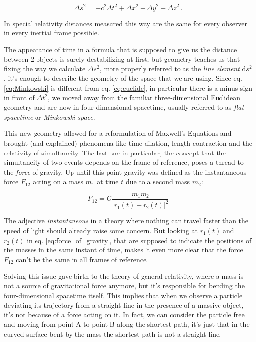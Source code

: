 \begin{equation}
    \Delta s^2 = - c^2 \Delta t^2 + \Delta x^2 + \Delta y^2 + \Delta z^2 \, .
    \label{eq:Minkowski}
\end{equation}

In special relativity distances measured this way are the same for every
observer in every inertial frame possible.

The appearance of time in a formula that is supposed to give us the distance
between 2 objects is surely destabilizing at first, but geometry teaches us
that fixing the way we calculate $\Delta s^2$, more properly referred to as the
\textit{line element} $\mathrm{d}s^2$, it's enough to describe the geometry of
the space that we are using.
Since eq. \ref{eq:Minkowski} is different from eq. \ref{eq:euclide}, in
particular there is a minus sign in front of $\Delta t^2$, we moved away from
the familiar three-dimensional Euclidean geometry and are now in
four-dimensional spacetime, usually referred to as \textit{flat spacetime} or
\textit{Minkowski space}.

This new geometry allowed for a reformulation of Maxwell's Equations and
brought (and explained) phenomena like time dilation, length contraction and the
relativity of simultaneity.
The last one in particular, the concept that the simultaneity of two events
depends on the frame of reference, poses a thread to the \textit{force} of
gravity.
Up until this point gravity was defined as the instantaneous force $F_{12}$
acting on a mass $m_1$ at time $t$ due to a second mass $m_2$:

\begin{equation}
    F_{12} = G \frac{m_1 m_2}{|r_1(t) - r_2(t)|^2}
    \label{eq:force_of_gravity}
\end{equation}

The adjective \textit{instantaneous} in a theory where nothing can travel
faster than the speed of light should already raise some concern.
But looking at $r_1(t)$ and $r_2(t)$ in eq. \ref{eq:force_of_gravity}, that are
supposed to indicate the positions of the masses in the same instant of time,
makes it even more clear that the force $F_{12}$ can't be the same in all
frames of reference.

Solving this issue gave birth to the theory of general relativity, where a mass
is not a source of gravitational force anymore, but it's responsible for
bending the four-dimensional spacetime itself.
This implies that when we observe a particle deviating its trajectory from a
straight line in the presence of a massive object, it's not because of a force
acting on it.
In fact, we can consider the particle free and moving from point A to point B
along the shortest path, it's just that in the curved surface bent by the mass
the shortest path is not a straight line.

